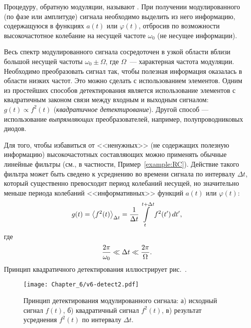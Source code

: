 
Процедуру, обратную модуляции, называют .
При получении модулированного (по фазе или амплитуде) сигнала необходимо
выделить из него информацию, содержащуюся в функциях $a(t)$ или
$\varphi(t)$, отбросив по возможности высокочастотное колебание
на несущей частоте $\omega_0$ (не несущее информации).

Весь спектр модулированного сигнала сосредоточен в узкой области
вблизи большой несущей частоты $\omega_0\pm \Omega$, где $\Omega$~---
характерная частота модуляции. Необходимо преобразовать сигнал так,
чтобы полезная информация оказалась в области низких частот. Это можно
сделать с использованием  элементов. 
Одним из простейших способов детектирования является использование 
элементов с квадратичным законом связи 
между входным и выходным сигналом:
$g(t)\propto f^2(t)$ (\emph{квадратичное детектирование}).
Другой способ --- использование \emph{выпрямляющих}
преобразователей, например, полупроводниковых диодов.

Для того, чтобы избавиться от <<ненужных>> (не содержащих полезную
информацию) высокочастотных составляющих можно применять обычные линейные
фильтры (см., в частности, Пример~\ref{example:RC}). Действие такого фильтра может быть сведено к усреднению во времени
сигнала по интервалу $\Delta t$, который существенно превосходит период
колебаний несущей, но значительно меньше периода колебаний <<информативных>>
функций $a(t)$ или $\varphi(t)$:
\begin{equation}
    \eqmark{averages-sq}
g(t) = \left<f^2(t)\right>_{\Delta t} = \frac{1}{\Delta t}
\int\limits_{t}^{t+\Delta t} f^2(t')\,dt',
\end{equation}
где
\begin{equation}
    \eqmark{averages-cond}
    \frac{2\pi}{\omega_0} \ll \Delta t \ll \frac{2\pi}{\Omega}.
\end{equation}
Принцип квадратичного детектирования иллюстрирует рис.~.
\begin{figure}[h]
 \texttt{[image: Chapter\_6/v6-detect2.pdf]}
 \caption{Принцип детектирования модулированного сигнала:
     а) исходный сигнал $f(t)$, б) квадратичный сигнал
 $f^2(t)$, в) результат усреднения $f^2(t)$ по интервалу $\Delta t$.
}
\end{figure}

